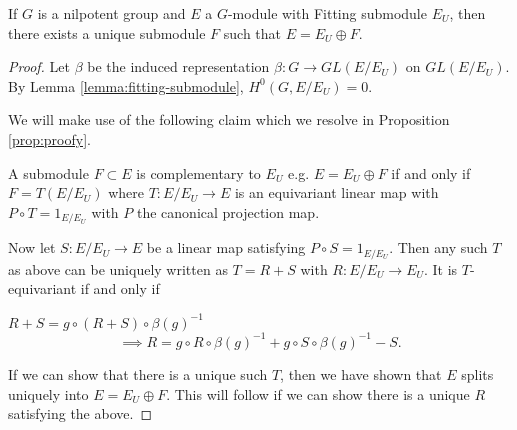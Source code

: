 \begin{lemma}
    If $G$ is a nilpotent group and $E$ a $G$-module with Fitting submodule $E_U$, then there exists a
    unique submodule $F$ such that $E = E_U \oplus F$.\label{lemma:fitting-unique-decomp}
\end{lemma}
\begin{proof}

    Let $\beta$ be the induced representation $\beta: G \to GL(E/E_U)$ on
    $GL(E/E_U)$. By Lemma \ref{lemma:fitting-submodule}, $H^0(G, E/E_U) = 0$.

    We will make use of the following claim which we resolve in Proposition
    \ref{prop:proofy}.
    \begin{claim}
        A submodule $F \subset E$ is complementary to $E_U$ e.g. $E = E_U \oplus F$ if and only if
        $F=T(E/E_U)$ where $T:E/E_U \to E$ is an equivariant linear map with $P \circ T = 1_{E/E_U}$ with $P$ the
        canonical projection map.
    \end{claim}

    Now let $S: E/E_U \to E$ be a linear map satisfying $P \circ S = 1_{E/E_U}$.
    Then any such $T$ as above can be uniquely written as $T = R + S$ with $R:
        E/E_U \to E_U$. It is $T$-equivariant if and only if

    \begin{center}
        $R + S = g \circ (R + S)\circ \beta(g)^{-1}$\\
        \begin{equation}\label{eq:fixed-point}
            \implies R = g\circ R \circ \beta(g)^{-1} + g\circ S \circ \beta(g)^{-1} - S.
        \end{equation}
    \end{center}
    If we can show that there is a unique such $T$, then we have shown that $E$ splits uniquely into $E = E_U \oplus F$.
    This will follow if we can show there is a unique $R$ satisfying the above.


\end{proof}

